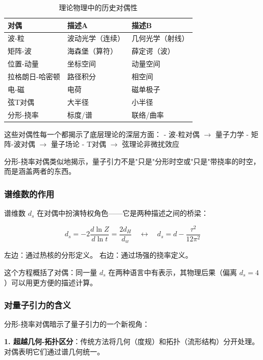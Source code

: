 \begin{table}[h]
\centering
\begin{tabular}{p{3cm}p{4cm}p{4cm}}
\hline
\textbf{对偶} & \textbf{描述A} & \textbf{描述B} \\
\hline
波-粒 & 波动光学（连续） & 几何光学（射线） \\
矩阵-波 & 海森堡（算符） & 薛定谔（波） \\
位置-动量 & 坐标空间 & 动量空间 \\
拉格朗日-哈密顿 & 路径积分 & 相空间 \\
电-磁 & 电荷 & 磁单极子 \\
弦T对偶 & 大半径 & 小半径 \\
\hline
分形-挠率 & 标度/谱 & 联络/曲率 \\
\hline
\end{tabular}
\caption{理论物理中的历史对偶性}
\end{table}

这些对偶性每一个都揭示了底层理论的深层方面：
- 波-粒对偶 $\to$ 量子力学
- 矩阵-波对偶 $\to$ 量子场论
- T对偶 $\to$ 弦理论非微扰效应

分形-挠率对偶类似地揭示，量子引力不是"只是"分形时空或"只是"带挠率的时空，而是涵盖两者的东西。

\subsubsection{谱维数的作用}

谱维数 $d_s$ 在对偶中扮演特权角色——它是两种描述之间的桥梁：

\begin{equation}
    \boxed{d_s = -2 \frac{d\ln Z}{d\ln t} = \frac{2d_H}{d_w} \quad \leftrightarrow \quad d_s = d - \frac{\tau^2}{12\pi^2}}
\end{equation}

左边：通过热核的分形定义。
右边：通过场强的挠率定义。

这个方程概括了对偶：同一量 $d_s$ 在两种语言中有表示，其物理后果（偏离 $d_s = 4$）可以用更方便的描述计算。

\subsubsection{对量子引力的含义}

分形-挠率对偶暗示了量子引力的一个新视角：

\textbf{1. 超越几何-拓扑区分}：传统方法将几何（度规）和拓扑（流形结构）分开处理。对偶表明它们通过谱几何统一。

